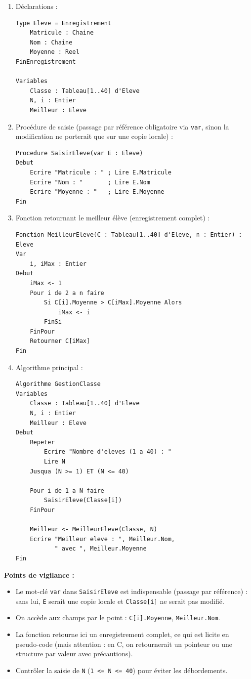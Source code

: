 \documentclass[11pt]{article}
\begin{document}
\begin{corrige}
\begin{enumerate}
    \item Déclarations :
\begin{lstlisting}
Type Eleve = Enregistrement
    Matricule : Chaine
    Nom : Chaine
    Moyenne : Reel
FinEnregistrement

Variables
    Classe : Tableau[1..40] d'Eleve
    N, i : Entier
    Meilleur : Eleve
\end{lstlisting}
    \item Procédure de saisie (passage par référence obligatoire via \texttt{var}, sinon la modification ne porterait que sur une copie locale) :
\begin{lstlisting}
Procedure SaisirEleve(var E : Eleve)
Debut
    Ecrire "Matricule : " ; Lire E.Matricule
    Ecrire "Nom : "       ; Lire E.Nom
    Ecrire "Moyenne : "   ; Lire E.Moyenne
Fin
\end{lstlisting}
    \item Fonction retournant le meilleur élève (enregistrement complet) :
\begin{lstlisting}
Fonction MeilleurEleve(C : Tableau[1..40] d'Eleve, n : Entier) : Eleve
Var
    i, iMax : Entier
Debut
    iMax <- 1
    Pour i de 2 a n faire
        Si C[i].Moyenne > C[iMax].Moyenne Alors
            iMax <- i
        FinSi
    FinPour
    Retourner C[iMax]
Fin
\end{lstlisting}
    \item Algorithme principal :
\begin{lstlisting}
Algorithme GestionClasse
Variables
    Classe : Tableau[1..40] d'Eleve
    N, i : Entier
    Meilleur : Eleve
Debut
    Repeter
        Ecrire "Nombre d'eleves (1 a 40) : "
        Lire N
    Jusqua (N >= 1) ET (N <= 40)

    Pour i de 1 a N faire
        SaisirEleve(Classe[i])
    FinPour

    Meilleur <- MeilleurEleve(Classe, N)
    Ecrire "Meilleur eleve : ", Meilleur.Nom,
           " avec ", Meilleur.Moyenne
Fin
\end{lstlisting}
\end{enumerate}
\textbf{Points de vigilance :}
\begin{itemize}
    \item Le mot-clé \texttt{var} dans \texttt{SaisirEleve} est indispensable (passage par référence) : sans lui, \texttt{E} serait une copie locale et \texttt{Classe[i]} ne serait pas modifié.
    \item On accède aux champs par le point : \texttt{C[i].Moyenne}, \texttt{Meilleur.Nom}.
    \item La fonction retourne ici un enregistrement complet, ce qui est licite en pseudo-code (mais attention : en C, on retournerait un pointeur ou une structure par valeur avec précautions).
    \item Contrôler la saisie de \texttt{N} (\texttt{1 <= N <= 40}) pour éviter les débordements.
\end{itemize}
\end{corrige}
\end{document}

